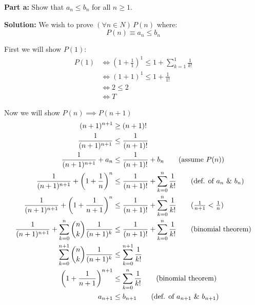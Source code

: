 \documentclass{article}
\begin{document}
\noindent\textbf{Part a:} Show that $a_n\le b_n$ for all $n\ge 1$.
\bigskip

\noindent\textbf{Solution:} We wish to prove $(\forall n\in N)\,P(n)$ where:
\begin{equation*}
  P(n)\equiv a_n\le b_n
\end{equation*}

First we will show $P(1)$:
\begin{align*}
  P(1)&\iff\left(1+\frac{1}{1}\right)^1\le 1+\sum^1_{k=1}\frac{1}{k!}\tag{def. of $P(1)$}\\
  &\iff(1+1)^1\le 1+\frac{1}{1!}\\
  &\iff2\le 2\\
  &\iff T
\end{align*}


Now we will show $P(n)\implies P(n+1)$
\begin{align*}
  (n+1)^{n+1}&\ge (n+1)!\\
  \frac{1}{(n+1)^{n+1}}&\le\frac{1}{(n+1)!}\\
  \frac{1}{(n+1)^{n+1}}+a_n&\le\frac{1}{(n+1)!}+b_n\tag{assume $P(n)$}\\
  \frac{1}{(n+1)^{n+1}}+\left(1+\frac{1}{n}\right)^n&\le\frac{1}{(n+1)!}+\sum_{k=0}^n\frac{1}{k!}\tag{def. of $a_n$ \& $b_n$}\\
  \frac{1}{(n+1)^{n+1}}+\left(1+\frac{1}{n+1}\right)^n&\le\frac{1}{(n+1)!}+\sum_{k=0}^n\frac{1}{k!}\tag{$\frac{1}{n+1}<\frac{1}{n}$}\\
  \frac{1}{(n+1)^{n+1}}+\sum^n_{k=0}\binom{n}{k}\frac{1}{(n+1)^k}&\le\frac{1}{(n+1)!}+\sum_{k=0}^n\frac{1}{k!}\tag{binomial theorem}\\
  \sum^{n+1}_{k=0}\binom{n}{k}\frac{1}{(n+1)^k}&\le\sum_{k=0}^{n+1}\frac{1}{k!}\\
  \left(1+\frac{1}{n+1}\right)^{n+1}&\le\sum_{k=0}^n\frac{1}{k!}\tag{binomial theorem}\\
  a_{n+1}&\le b_{n+1}\tag{def. of $a_{n+1}$ \& $b_{n+1}$}
\end{align*}
\end{document}
